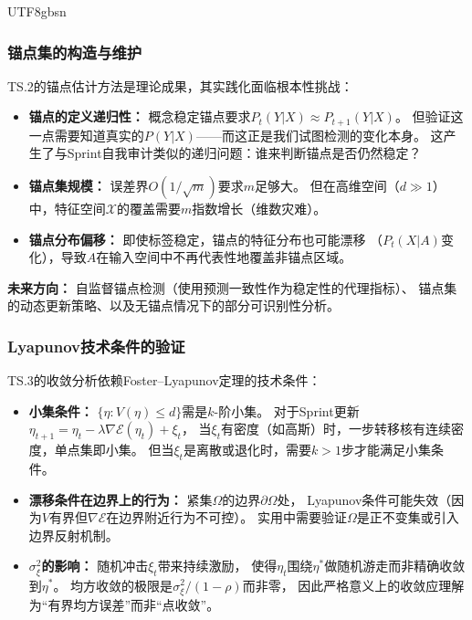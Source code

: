 \documentclass[12pt,a4paper]{article}
\newcommand{\cX}{\mathcal{X}}
\begin{document}
\begin{CJK}{UTF8}{gbsn}
\subsubsection{锚点集的构造与维护}
TS.2的锚点估计方法是理论成果，其实践化面临根本性挑战：
\begin{itemize}
\item \textbf{锚点的定义递归性：} 概念稳定锚点要求$P_t(Y|X) \approx P_{t+1}(Y|X)$。
但验证这一点需要知道真实的$P(Y|X)$——而这正是我们试图检测的变化本身。
这产生了与Sprint自我审计类似的递归问题：谁来判断锚点是否仍然稳定？
\item \textbf{锚点集规模：} 误差界$O(1/\sqrt{m})$要求$m$足够大。
但在高维空间（$d \gg 1$）中，特征空间$\cX$的覆盖需要$m$指数增长（维数灾难）。
\item \textbf{锚点分布偏移：} 即使标签稳定，锚点的特征分布也可能漂移
（$P_t(X|A)$变化），导致$A$在输入空间中不再代表性地覆盖非锚点区域。
\end{itemize}
\textbf{未来方向：} 自监督锚点检测（使用预测一致性作为稳定性的代理指标）、
锚点集的动态更新策略、以及无锚点情况下的部分可识别性分析。

\subsubsection{Lyapunov技术条件的验证}
TS.3的收敛分析依赖Foster--Lyapunov定理的技术条件：
\begin{itemize}
\item \textbf{小集条件：} $\{\eta: V(\eta) \le d\}$需是$k$-阶小集。
对于Sprint更新$\eta_{t+1} = \eta_t - \lambda\nabla\mathcal{E}(\eta_t) + \xi_t$，
当$\xi_t$有密度（如高斯）时，一步转移核有连续密度，单点集即小集。
但当$\xi_t$是离散或退化时，需要$k>1$步才能满足小集条件。
\item \textbf{漂移条件在边界上的行为：} 紧集$\Omega$的边界$\partial\Omega$处，
Lyapunov条件可能失效（因为$V$有界但$\nabla\mathcal{E}$在边界附近行为不可控）。
实用中需要验证$\Omega$是正不变集或引入边界反射机制。
\item \textbf{$\sigma_\xi^2$的影响：} 随机冲击$\xi_t$带来持续激励，
使得$\eta_t$围绕$\eta^*$做随机游走而非精确收敛到$\eta^*$。
均方收敛的极限是$\sigma_\xi^2/(1-\rho)$而非零，
因此严格意义上的收敛应理解为``有界均方误差''而非``点收敛''。
\end{itemize}


\end{CJK}
\end{document}
